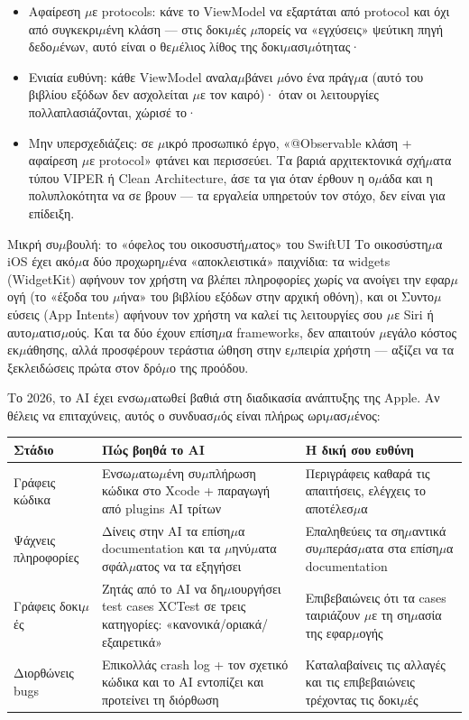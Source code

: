 \begin{itemize}
  \item Αφαίρεση $\mu$ε protocols: κάνε το ViewModel να εξαρτάται από protocol και όχι από συγκεκρι$\mu$ένη κλάση — στις δοκι$\mu$ές $\mu$πορείς να «εγχύσεις» ψεύτικη πηγή δεδο$\mu$ένων, αυτό είναι ο θε$\mu$έλιος λίθος της δοκι$\mu$ασι$\mu$ότητας·
  \item Ενιαία ευθύνη: κάθε ViewModel αναλα$\mu$βάνει $\mu$όνο ένα πράγ$\mu$α (αυτό του βιβλίου εξόδων δεν ασχολείται $\mu$ε τον καιρό)· όταν οι λειτουργίες πολλαπλασιάζονται, χώρισέ το·
  \item Μην υπερσχεδιάζεις: σε $\mu$ικρό προσωπικό έργο, «@Observable κλάση + αφαίρεση $\mu$ε protocol» φτάνει και περισσεύει. Τα βαριά αρχιτεκτονικά σχή$\mu$ατα τύπου VIPER ή Clean Architecture, άσε τα για όταν έρθουν η ο$\mu$άδα και η πολυπλοκότητα να σε βρουν — τα εργαλεία υπηρετούν τον στόχο, δεν είναι για επίδειξη.
\end{itemize}

\begin{tcbinfo}{Μικρή συ$\mu$βουλή: το «όφελος του οικοσυστή$\mu$ατος» του SwiftUI}
Το οικοσύστη$\mu$α iOS έχει ακό$\mu$α δύο προχωρη$\mu$ένα «αποκλειστικά» παιχνίδια: τα widgets (WidgetKit) αφήνουν τον χρήστη να βλέπει πληροφορίες χωρίς να ανοίγει την εφαρ$\mu$ογή (το «έξοδα του $\mu$ήνα» του βιβλίου εξόδων στην αρχική οθόνη), και οι Συντο$\mu$εύσεις (App Intents) αφήνουν τον χρήστη να καλεί τις λειτουργίες σου $\mu$ε Siri ή αυτο$\mu$ατισ$\mu$ούς. Και τα δύο έχουν επίση$\mu$α frameworks, δεν απαιτούν $\mu$εγάλο κόστος εκ$\mu$άθησης, αλλά προσφέρουν τεράστια ώθηση στην ε$\mu$πειρία χρήστη — αξίζει να τα ξεκλειδώσεις πρώτα στον δρό$\mu$ο της προόδου.

\end{tcbinfo}


Το 2026, το AI έχει ενσω$\mu$ατωθεί βαθιά στη διαδικασία ανάπτυξης της Apple. Αν θέλεις να επιταχύνεις, αυτός ο συνδυασ$\mu$ός είναι πλήρως ωρι$\mu$ασ$\mu$ένος:

\begin{center}
\begin{tabularx}{\linewidth}{|X|X|X|}
\hline
\textbf{Στάδιο} & \textbf{Πώς βοηθά το AI} & \textbf{Η δική σου ευθύνη} \tabularnewline
\hline
Γράφεις κώδικα & Ενσω$\mu$ατω$\mu$ένη συ$\mu$πλήρωση κώδικα στο Xcode + παραγωγή από plugins AI τρίτων & Περιγράφεις καθαρά τις απαιτήσεις, ελέγχεις το αποτέλεσ$\mu$α \tabularnewline
Ψάχνεις πληροφορίες & Δίνεις στην AI τα επίση$\mu$α documentation και τα $\mu$ηνύ$\mu$ατα σφάλ$\mu$ατος να τα εξηγήσει & Επαληθεύεις τα ση$\mu$αντικά συ$\mu$περάσ$\mu$ατα στα επίση$\mu$α documentation \tabularnewline
Γράφεις δοκι$\mu$ές & Ζητάς από το AI να δη$\mu$ιουργήσει test cases XCTest σε τρεις κατηγορίες: «κανονικά/οριακά/εξαιρετικά» & Επιβεβαιώνεις ότι τα cases ταιριάζουν $\mu$ε τη ση$\mu$ασία της εφαρ$\mu$ογής \tabularnewline
Διορθώνεις bugs & Επικολλάς crash log + τον σχετικό κώδικα και το AI εντοπίζει και προτείνει τη διόρθωση & Καταλαβαίνεις τις αλλαγές και τις επιβεβαιώνεις τρέχοντας τις δοκι$\mu$ές \tabularnewline
\hline
\end{tabularx}
\end{center}

